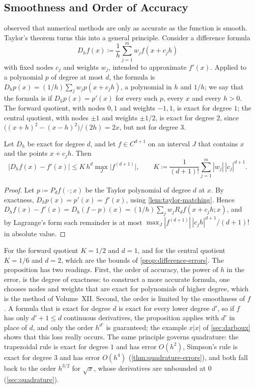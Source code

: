 \subsection{Smoothness and Order of Accuracy}

 observed that numerical methods are only as accurate as the function is smooth. Taylor's theorem turns this into a general principle. Consider a difference formula
\[
D_hf(x)\coloneqq\frac1h\sum_{j=1}^mw_jf(x+c_jh)
\]
with fixed nodes $c_j$ and weights $w_j$, intended to approximate $f'(x)$. Applied to a polynomial $p$ of degree at most $d$, the formula is $D_hp(x)=(1/h)\sum_jw_jp(x+c_jh)$, a polynomial in $h$ and $1/h$; we say that the formula is  if $D_hp(x)=p'(x)$ for every such $p$, every $x$ and every $h>0$. The forward quotient, with nodes $0,1$ and weights $-1,1$, is exact for degree $1$; the central quotient, with nodes $\pm1$ and weights $\pm1/2$, is exact for degree $2$, since $\bigl((x+h)^2-(x-h)^2\bigr)/(2h)=2x$, but not for degree $3$.

\begin{proposition}
\label{prop:exactness-order}
Let $D_h$ be exact for degree $d$, and let $f\in C^{d+1}$ on an interval $J$ that contains $x$ and the points $x+c_jh$. Then
\[
\bigl|D_hf(x)-f'(x)\bigr|\le K\,h^d\max_J\bigl|f^{(d+1)}\bigr|,\qquad K\coloneqq\frac1{(d+1)!}\sum_{j=1}^m|w_j|\,|c_j|^{d+1}.
\]
\end{proposition}

\begin{proof}
Let $p\coloneqq P_df(\cdot\,;x)$ be the Taylor polynomial of degree $d$ at $x$. By exactness, $D_hp(x)=p'(x)=f'(x)$, using \cref{lem:taylor-matching}. Hence $D_hf(x)-f'(x)=D_h(f-p)(x)=(1/h)\sum_jw_jR_df(x+c_jh;x)$, and by Lagrange's form each remainder is at most $\max_J|f^{(d+1)}|\,|c_jh|^{d+1}/(d+1)!$ in absolute value.
\end{proof}

For the forward quotient $K=1/2$ and $d=1$, and for the central quotient $K=1/6$ and $d=2$, which are the bounds of \cref{prop:difference-errors}. The proposition has two readings. First, the order of accuracy, the power of $h$ in the error, is the degree of exactness: to construct a more accurate formula, one chooses nodes and weights that are exact for polynomials of higher degree, which is the method of Volume~XII. Second, the order is limited by the smoothness of $f$. A formula that is exact for degree $d$ is exact for every lower degree $d'$, so if $f$ has only $d'+1\le d$ continuous derivatives, the proposition applies with $d'$ in place of $d$, and only the order $h^{d'}$ is guaranteed; the example $x|x|$ of \cref{sec:darboux} shows that this loss really occurs. The same principle governs quadrature: the trapezoidal rule is exact for degree $1$ and has error $O(h^2)$, Simpson's rule is exact for degree $3$ and has error $O(h^4)$ (\cref{thm:quadrature-errors}), and both fall back to the order $h^{3/2}$ for $\sqrt x$, whose derivatives are unbounded at $0$ (\cref{sec:quadrature}).


